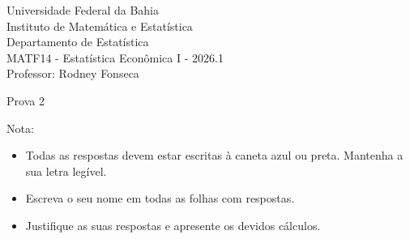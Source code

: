 \documentclass{article}
\date{--/--/----} %
\begin{document}
\begin{flushleft}
	Universidade Federal da Bahia\\
	Instituto de Matemática e Estatística\\
	Departamento de Estatística\\
	MATF14 - Estatística Econômica I - 2026.1\\
	Professor: Rodney Fonseca \\
\end{flushleft}

\begin{center}
	\begin{Large}
		Prova 2 \\
	\end{Large}	
\end{center}

\hspace{2em} Nota: 

\vspace{1em}

\begin{flushleft}
\begin{small}

\begin{itemize}
	\item Todas as respostas devem estar escritas à caneta azul ou preta. Mantenha a sua letra legível.
	\item Escreva o seu nome em todas as folhas com respostas.
	\item Justifique as suas respostas e apresente os devidos cálculos.
\end{itemize}

\end{small}
\end{flushleft}

\vspace{1em}
\end{document}
